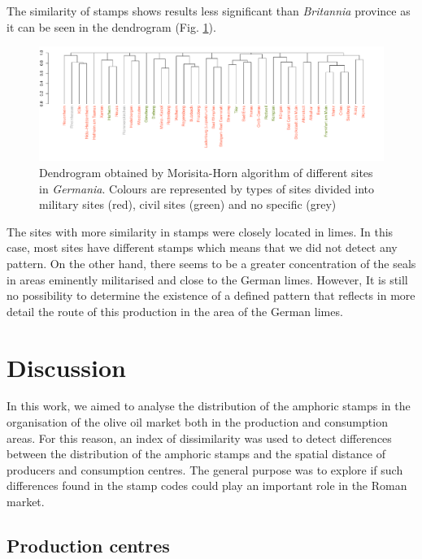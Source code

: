 \documentclass[review]{elsarticle}
\begin{document}
The similarity of stamps shows results less significant than \textit{Britannia} province as it can be seen in the dendrogram (Fig. \ref{germap}). 

\begin{figure}
	\centering
\includegraphics[width=\linewidth]{figs/dendroger5.pdf}
\caption{Dendrogram obtained by Morisita-Horn algorithm of different sites in \textit{Germania}. Colours are represented by types of sites divided into military sites (red), civil sites (green) and no specific (grey)}
\label{germap}
\end{figure}


The sites with more similarity in stamps were closely located in limes. In this case, most sites have different stamps which means that we did not detect any pattern. On the other hand, there seems to be a greater concentration of the seals in areas eminently militarised and close to the German limes. However, It is still no possibility to determine the existence of a defined pattern that reflects in more detail the route of this production in the area of the German limes.


\section{Discussion}


In this work, we aimed to analyse the distribution of the amphoric stamps in the organisation of the olive oil market both in the production and consumption areas. For this reason, an index of dissimilarity was used to detect differences between the distribution of the amphoric stamps and the spatial distance of producers and consumption centres. The general purpose was to explore if such differences found in the stamp codes could play an important role in the Roman market.  

\subsection{Production centres}
\end{document}
